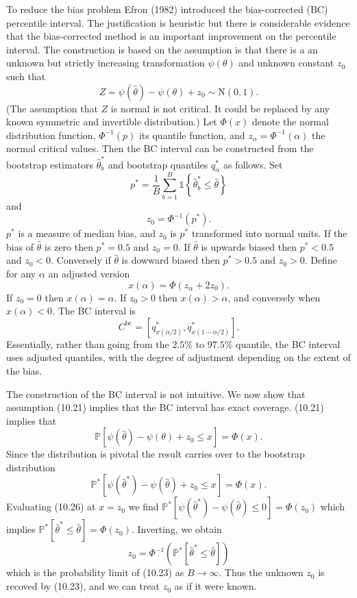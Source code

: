 \documentclass[10pt]{article}
\begin{document}
To reduce the bias problem Efron (1982) introduced the bias-corrected (BC) percentile interval. The justification is heuristic but there is considerable evidence that the bias-corrected method is an important improvement on the percentile interval. The construction is based on the assumption is that there is a an unknown but strictly increasing transformation $\psi(\theta)$ and unknown constant $z_{0}$ such that
$$
Z=\psi(\widehat{\theta})-\psi(\theta)+z_{0} \sim \mathrm{N}(0,1) .
$$
(The assumption that $Z$ is normal is not critical. It could be replaced by any known symmetric and invertible distribution.) Let $\Phi(x)$ denote the normal distribution function, $\Phi^{-1}(p)$ its quantile function, and $z_{\alpha}=\Phi^{-1}(\alpha)$ the normal critical values. Then the BC interval can be constructed from the bootstrap estimators $\widehat{\theta}_{b}^{*}$ and bootstrap quantiles $q_{\alpha}^{*}$ as follows. Set
$$
p^{*}=\frac{1}{B} \sum_{b=1}^{B} \mathbb{1}\left\{\widehat{\theta}_{b}^{*} \leq \widehat{\theta}\right\}
$$
and
$$
z_{0}=\Phi^{-1}\left(p^{*}\right) .
$$
$p^{*}$ is a measure of median bias, and $z_{0}$ is $p^{*}$ transformed into normal units. If the bias of $\widehat{\theta}$ is zero then $p^{*}=0.5$ and $z_{0}=0$. If $\widehat{\theta}$ is upwards biased then $p^{*}<0.5$ and $z_{0}<0$. Conversely if $\widehat{\theta}$ is dowward biased then $p^{*}>0.5$ and $z_{0}>0$. Define for any $\alpha$ an adjusted version
$$
x(\alpha)=\Phi\left(z_{\alpha}+2 z_{0}\right) .
$$
If $z_{0}=0$ then $x(\alpha)=\alpha$. If $z_{0}>0$ then $x(\alpha)>\alpha$, and conversely when $x(\alpha)<0$. The BC interval is
$$
C^{\mathrm{bc}}=\left[q_{x(\alpha / 2)}^{*}, q_{x(1-\alpha / 2)}^{*}\right] .
$$
Essentially, rather than going from the $2.5 \%$ to $97.5 \%$ quantile, the BC interval uses adjusted quantiles, with the degree of adjustment depending on the extent of the bias.

The construction of the BC interval is not intuitive. We now show that assumption (10.21) implies that the BC interval has exact coverage. (10.21) implies that
$$
\mathbb{P}\left[\psi(\widehat{\theta})-\psi(\theta)+z_{0} \leq x\right]=\Phi(x) .
$$
Since the distribution is pivotal the result carries over to the bootstrap distribution
$$
\mathbb{P}^{*}\left[\psi\left(\widehat{\theta}^{*}\right)-\psi(\widehat{\theta})+z_{0} \leq x\right]=\Phi(x) .
$$
Evaluating (10.26) at $x=z_{0}$ we find $\mathbb{P}^{*}\left[\psi\left(\widehat{\theta}^{*}\right)-\psi(\widehat{\theta}) \leq 0\right]=\Phi\left(z_{0}\right)$ which implies $\mathbb{P}^{*}\left[\widehat{\theta}^{*} \leq \widehat{\theta}\right]=\Phi\left(z_{0}\right)$. Inverting, we obtain
$$
z_{0}=\Phi^{-1}\left(\mathbb{P}^{*}\left[\widehat{\theta}^{*} \leq \widehat{\theta}\right]\right)
$$
which is the probability limit of (10.23) as $B \rightarrow \infty$. Thus the unknown $z_{0}$ is recoved by (10.23), and we can treat $z_{0}$ as if it were known.
\end{document}
